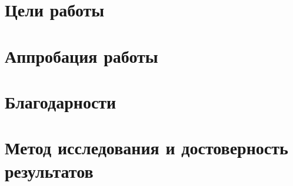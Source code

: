 \section{Цели работы}

\section{Аппробация работы}

\section{Благодарности}

\section{Метод исследования и достоверность результатов}
